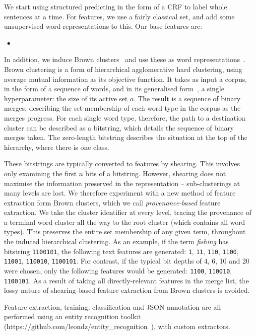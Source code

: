 \documentclass[journal,10pt,draftclsnofoot,onecolumn]{IEEEtran}
\begin{document}
We start using structured predicting in the form of a CRF to label whole sentences at a time.
For features, we use a fairly classical set, and add some unsupervised word representations to this.
Our base features are:

\begin{itemize}
\item 
\end{itemize}

In addition, we induce Brown clusters~\cite{brown1992class} and use these as word representations~\cite{turian2009preliminary}.
Brown clustering is a form of hierarchical agglomerative hard clustering, using average mutual information as its objective function.
It takes as input a corpus, in the form of a sequence of words, and in its generalised form~\cite{derczynski2016generalised}, a single hyperparameter: the size of its active set $a$.
The result is a sequence of binary merges, describing the set membership of each word type in the corpus as the merges progress.
For each single word type, therefore, the path to a destination cluster can be described as a bitstring, which details the sequence of binary merges taken.
The zero-length bitstring describes the situation at the top of the hierarchy, where there is one class.

These bitstrings are typically converted to features by shearing.
This involves only examining the first $n$ bits of a bitstring.
However, shearing does not maximise the information preserved in the representation -- sub-clusterings at many levels are lost.
We therefore experiment with a new method of feature extraction form Brown clusters, which we call {\em provenance-based} feature extraction.
We take the cluster identifier at every level, tracing the provenance of a terminal word cluster all the way to the root cluster (which contains all word types).
This preserves the entire set membership of any given term, throughout the induced hierarchical clustering.
As an example, if the term \emph{fishing} has bitstring {\tt 1100101}, the following text features are generated: {\tt 1}, {\tt 11}, {\tt 110}, {\tt 1100}, {\tt 11001}, {\tt 110010}, {\tt 1100101}.
For contrast, if the typical bit depths of 4, 6, 10 and 20~\cite{ratinov2009design} were chosen, only the following features would be generated: {\tt 1100}, {\tt 110010}, {\tt 1100101}.
As a result of taking all directly-relevant features in the merge list, the lossy nature of shearing-based feature extraction from Brown clusters is avoided.

Feature extraction, training, classification and JSON annotation are all performed using an entity recognition toolkit (https://github.com/leondz/entity\_recognition~\cite{derczynski2015usfd}), with custom extractors.
\end{document}
